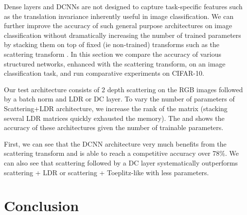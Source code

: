 Dense layers and DCNNs are not designed to capture task-specific features such as the translation invariance inherently useful in image classification.
We can further improve the accuracy of such general purpose architectures on image classification without dramatically increasing the number of trained parameters by stacking them on top of fixed (ie non-trained) transforms such as the scattering transform \cite{mallat2010recursive}.
In this section we compare the accuracy of various structured networks, enhanced with the scattering transform, on an image classification task, and run comparative experiments on CIFAR-10. 

Our test architecture consists of 2 depth scattering on the RGB images followed by a batch norm and LDR or DC layer.
To vary the number of parameters of Scattering+LDR architecture, we increase the rank of the matrix (stacking several LDR matrices quickly exhausted the memory).
The  and  shows the accuracy of these architectures given the number of trainable parameters.

First, we can see that the DCNN architecture very much benefits from the scattering transform and is able to reach a competitive accuracy over 78\%.
We can also see that scattering followed by a DC layer systematically outperforms scattering + LDR or scattering + Toeplitz-like with less parameters. 





\section{Conclusion}
\label{section:ch4-discussion}


